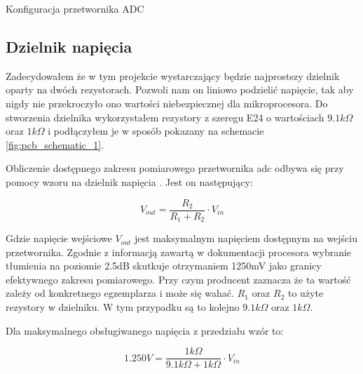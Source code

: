        \begin{kod}
          \inputminted[firstline=3,lastline=11]{cpp}{esp/listings/adc.cpp}
          \caption{Konfiguracja przetwornika ADC}
          \label{code:adc1}
          \vspace{2em}
        \end{kod}
        

    

        
    \subsection{Dzielnik napięcia}
        Zadecydowałem że w tym projekcie wystarczający będzie najprostszy dzielnik oparty na dwóch rezystorach. Pozwoli nam on liniowo podzielić napięcie, tak aby nigdy nie przekroczyło ono wartości niebezpiecznej dla mikroprocesora. Do stworzenia dzielnika wykorzystałem rezystory z szeregu E24 \cite{szereg} o wartościach $9.1k \Omega $ oraz $1k \Omega $ i podłączyłem je w sposób pokazany na schemacie \ref{fig:pcb_schematic_1}.
        
        Obliczenie dostępnego zakresu pomiarowego przetwornika adc odbywa się przy pomocy wzoru na dzielnik napięcia \cite{dzielnik}. Jest on następujący:
        
        \vspace{1em}
        \begin{displaymath}
          V_{out} = \frac{ R_2 }{ R_1 + R_2 } \cdot V_{in}
        \end{displaymath}
        \vspace{1em}
        
        Gdzie napięcie wejściowe $V_{out}$ jest maksymalnym napięciem dostępnym na wejściu przetwornika. Zgodnie z informacją zawartą w dokumentacji procesora \cite{esp32} wybranie tłumienia na poziomie 2.5dB skutkuje otrzymaniem 1250mV jako granicy efektywnego zakresu pomiarowego. Przy czym producent zaznacza że ta wartość zależy od konkretnego egzemplarza i może się wahać. $R_1$ oraz $R_2$ to użyte rezystory w dzielniku. W tym przypadku są to kolejno $9.1k \Omega $ oraz $1k \Omega $.
        
        Dla maksymalnego obsługiwanego napięcia z przedziału wzór to:
        
        \vspace{1em}
        \begin{displaymath}
          1.250V = \frac{ 1k \Omega  }{ 9.1k \Omega  + 1k \Omega  } \cdot V_{in}
        \end{displaymath}
        \vspace{1em}
        

